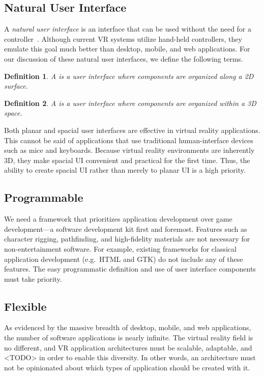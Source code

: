 \documentclass[conference,12pt]{IEEEtran}
\newtheorem{definition}{Definition}
\begin{document}
\subsection{Natural User Interface}
A \textit{natural user interface} is an interface that can be used without the
need for a controller~\cite{Wimmers:2015:VR:Natural-UI}. Although current VR
systems utilize hand-held controllers, they emulate this goal much better than
desktop, mobile, and web applications. For our discussion of these natural user
interfaces, we define the following terms.

\begin{definition}
    A {\normalfont{}} is a user interface where components are
    organized along a 2D surface.
\end{definition}

\begin{definition}
    A {\normalfont{}} is a user interface where components are
    organized within a 3D space.
\end{definition}


Both planar and spacial user interfaces are effective in virtual reality
applications. This cannot be said of applications that use traditional
human-interface devices such as mice and keyboards. Because virtual reality
environments are inherently 3D, they make spacial UI convenient and practical
for the first time. Thus, the ability to create spacial UI rather than merely to
planar UI is a high priority.

\subsection{Programmable}
We need a framework that prioritizes application development over game
development---a software development kit first and foremost. Features such as
character rigging, pathfinding, and high-fidelity materials are not necessary
for non-entertainment software. For example, existing frameworks for classical
application development (e.g.\ HTML and GTK) do not include any of these
features. The easy programmatic definition and use of user interface components
must take priority.

\subsection{Flexible}
As evidenced by the massive breadth of desktop, mobile, and web applications,
the number of software applications is nearly infinite. The virtual reality
field is no different, and VR application architectures must be scalable,
adaptable, and <TODO> in order to enable this diversity. In other words, an
architecture must not be opinionated about which types of application should be
created with it. %
\end{document}
